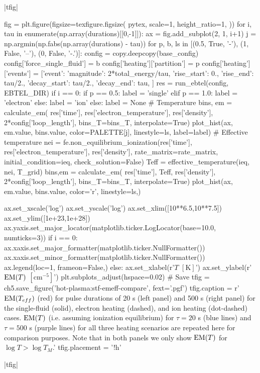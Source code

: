 \py[chapter5]|tfig|

\begin{pycode}[chapter5]
fig = plt.figure(figsize=texfigure.figsize(
    pytex,
    scale=1,
    height_ratio=1,
))
for i, tau in enumerate(np.array(durations)[[0,-1]]):
    ax = fig.add_subplot(2, 1, i+1)
    j = np.argmin(np.fabs(np.array(durations) - tau))
    for p, b, ls in [(0.5, True, '-'), (1, False, '--'), (0, False, '-.')]:
        config = copy.deepcopy(base_config)
        config['force_single_fluid'] = b
        config['heating']['partition'] = p
        config['heating']['events'] = [{'event': {
            'magnitude': 2*total_energy/tau,
            'rise_start': 0.,
            'rise_end': tau/2.,
            'decay_start': tau/2.,
            'decay_end': tau,
        }}]
        res = run_ebtel(config, EBTEL_DIR)
        if i == 0:
            if p == 0.5:
                label = 'single'
            elif p == 1.0:
                label = 'electron'
            else:
                label = 'ion'
        else:
            label = None
        # Temperature
        bins, em = calculate_em(
            res['time'],
            res['electron_temperature'],
            res['density'],
            2*config['loop_length'],
            bins_T=bins_T,
            interpolate=True)
        plot_hist(ax, em.value, bins.value, color=PALETTE[j], linestyle=ls, label=label)
        # Effective temperature
        nei = fe.non_equilibrium_ionization(res['time'], res['electron_temperature'], res['density'],
                                            rate_matrix=rate_matrix, initial_condition=ieq,
                                            check_solution=False)
        Teff = effective_temperature(ieq, nei, T_grid)
        bins,em = calculate_em(
            res['time'],
            Teff,
            res['density'],
            2*config['loop_length'],
            bins_T=bins_T,
            interpolate=True)
        plot_hist(ax, em.value, bins.value, color='r', linestyle=ls,)
    
    ax.set_xscale('log')
    ax.set_yscale('log')
    ax.set_xlim([10**6.5,10**7.5])
    ax.set_ylim([1e+23,1e+28])
    ax.yaxis.set_major_locator(matplotlib.ticker.LogLocator(base=10.0, numticks=3))
    if i == 0:
        ax.xaxis.set_major_formatter(matplotlib.ticker.NullFormatter())
        ax.xaxis.set_minor_formatter(matplotlib.ticker.NullFormatter())
        ax.legend(loc=1, frameon=False,)
    else:
        ax.set_xlabel(r'$T$ $[\si{\kelvin}]$')
    ax.set_ylabel(r'$\textup{EM}(T)$ $[\si{\cm\tothe{-5}}]$')
plt.subplots_adjust(hspace=0.02)
# Save
tfig = ch5.save_figure('hot-plasma:stf-emeff-compare', fext='.pgf')
tfig.caption = r'$\emd[T_{eff}]$ (red) for pulse durations of 20 s (left panel) and 500 s (right panel) for the single-fluid (solid), electron heating (dashed), and ion heating (dot-dashed) cases. $\emd[T]$ (i.e. assuming ionization equilibrium) for $\tau=20$ s (blue lines) and $\tau=500$ s (purple lines) for all three heating scenarios are repeated here for comparison purposes. Note that in both panels we only show $\emd[T]$ for $\log{T}>\log{T_M}$.'
tfig.placement = '!h'
\end{pycode}
\py[chapter5]|tfig|

